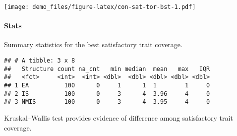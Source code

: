 \documentclass[]{book}
\newenvironment{Shaded}{\begin{snugshade}}{\end{snugshade}}
\newcommand{\CharTok}[1]{\textcolor[rgb]{0.31,0.60,0.02}{#1}}
\newcommand{\CommentTok}[1]{\textcolor[rgb]{0.56,0.35,0.01}{\textit{#1}}}
\newcommand{\DataTypeTok}[1]{\textcolor[rgb]{0.13,0.29,0.53}{#1}}
\newcommand{\KeywordTok}[1]{\textcolor[rgb]{0.13,0.29,0.53}{\textbf{#1}}}
\newcommand{\NormalTok}[1]{#1}
\newcommand{\OperatorTok}[1]{\textcolor[rgb]{0.81,0.36,0.00}{\textbf{#1}}}
\newcommand{\OtherTok}[1]{\textcolor[rgb]{0.56,0.35,0.01}{#1}}
\newcommand{\StringTok}[1]{\textcolor[rgb]{0.31,0.60,0.02}{#1}}
\let\oldparagraph\paragraph
\renewcommand{\paragraph}[1]{\oldparagraph{#1}\mbox{}}
\begin{document}
\texttt{[image: demo\_files/figure-latex/con-sat-tor-bst-1.pdf]}

\hypertarget{stats-11}{%
\paragraph{Stats}\label{stats-11}}

Summary statistics for the best satisfactory trait coverage.

\begin{Shaded}
\end{Shaded}

\begin{verbatim}
## # A tibble: 3 x 8
##   Structure count na_cnt   min median  mean   max   IQR
##   <fct>     <int>  <int> <dbl>  <dbl> <dbl> <dbl> <dbl>
## 1 EA          100      0     1      1  1        1     0
## 2 IS          100      0     3      4  3.96     4     0
## 3 NMIS        100      0     3      4  3.95     4     0
\end{verbatim}

Kruskal--Wallis test provides evidence of difference among satisfactory trait coverage.
\end{document}
